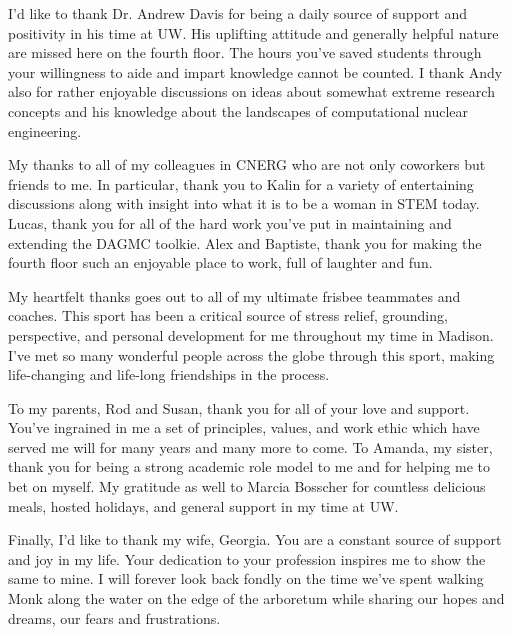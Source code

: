 I'd like to thank Dr. Andrew Davis for being a daily source of support and
positivity in his time at UW. His uplifting attitude and generally helpful
nature are missed here on the fourth floor. The hours you've saved students through
your willingness to aide and impart knowledge cannot be counted. I thank Andy
also for rather enjoyable discussions on ideas about somewhat extreme research
concepts and his knowledge about the landscapes of computational nuclear
engineering.

My thanks to all of my colleagues in CNERG who are not only coworkers but
friends to me. In particular, thank you to Kalin for a variety of entertaining
discussions along with insight into what it is to be a woman in STEM
today. Lucas, thank you for all of the hard work you've put in maintaining and
extending the DAGMC toolkie. Alex and Baptiste, thank you for making the fourth
floor such an enjoyable place to work, full of laughter and fun.

My heartfelt thanks goes out to all of my ultimate frisbee teammates and
coaches. This sport has been a critical source of stress relief, grounding,
perspective, and personal development for me throughout my time in Madison. I've
met so many wonderful people across the globe through this sport, making
life-changing and life-long friendships in the process.

To my parents, Rod and Susan, thank you for all of your love and support. You've
ingrained in me a set of principles, values, and work ethic which have served me
will for many years and many more to come. To Amanda, my sister, thank you for
being a strong academic role model to me and for helping me to bet on myself. My
gratitude as well to Marcia Bosscher for countless delicious meals, hosted
holidays, and general support in my time at UW.

Finally, I'd like to thank my wife, Georgia. You are a constant source of
support and joy in my life. Your dedication to your profession inspires me to
show the same to mine. I will forever look back fondly on the time we've spent
walking Monk along the water on the edge of the arboretum while sharing our
hopes and dreams, our fears and frustrations.
